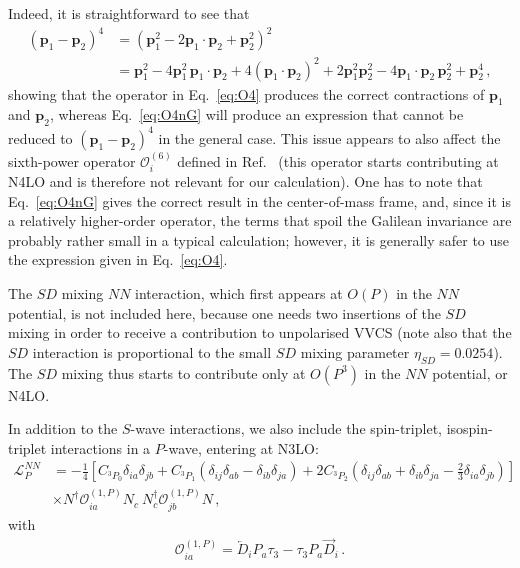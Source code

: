 \documentclass[prl,
twocolumn,
showpacs,preprintnumbers,amsmath,amssymb,
superscriptaddress,
a4paper,nofootinbib,longbibliography]{revtex4-2}
\def\bv#1{\boldsymbol{#1}}
\begin{document}
Indeed, it is straightforward to see that
\begin{align}
    (\bv{p}_1-\bv{p}_2)^4 &= (\bv{p}_1^2-2\bv{p}_1\cdot\bv{p}_2+\bv{p}_2^2)^2 \nonumber\\
    & = \bv{p}_1^2-4\bv{p}_1^2\, \bv{p}_1\cdot\bv{p}_2 +4(\bv{p}_1\cdot \bv{p}_2)^2 + 2\bv{p}_1^2\bv{p}_2^2 - 4 \bv{p}_1\cdot\bv{p}_2\, \bv{p}_2^2+\bv{p}_2^4\,,
\end{align}
showing that the operator in Eq.~\eqref{eq:O4} produces the correct contractions of $\bv{p}_1$ and $\bv{p}_2$, whereas Eq.~\eqref{eq:O4nG} will produce an expression that cannot be reduced to $(\bv{p}_1-\bv{p}_2)^4$ in the general case. This issue appears to also affect the sixth-power operator $\mathcal{O}^{(6)}_i$ defined in Ref.~\cite{Rupak:1999rk} (this operator starts contributing at N4LO and is therefore not relevant for our calculation). One has to note that Eq.~\eqref{eq:O4nG} gives the correct result in the center-of-mass frame, and, since it is a relatively higher-order operator, the terms that spoil the Galilean invariance are probably rather small in a typical calculation; however, it is generally safer to use the expression given in Eq.~\eqref{eq:O4}.

The $SD$ mixing $NN$ interaction, which first appears at $O(P)$ in the $NN$ potential, is not included here, because one needs two insertions of the $SD$ mixing in order to receive a contribution to unpolarised VVCS (note also that the $SD$ interaction is proportional to the small $SD$ mixing parameter $\eta_{SD}=0.0254$). The $SD$ mixing thus starts to contribute only at $O(P^3)$ in the $NN$ potential, or N4LO.

In addition to the $S$-wave interactions, we also include the spin-triplet, isospin-triplet interactions in a $P$-wave, entering at N3LO:
\begin{align}
 \mathcal{L}^{NN}_P&=-\frac{1}{4}\left[
   C_{{}^{3\!}P_0}\delta_{ia}\delta_{jb}
 + C_{{}^{3\!}P_1}\left(\delta_{ij}\delta_{ab}-\delta_{ib}\delta_{ja}\right)
 +2C_{{}^{3\!}P_2}\left(\delta_{ij}\delta_{ab}+\delta_{ib}\delta_{ja}-\frac{2}{3}\delta_{ia}\delta_{jb}\right)
 \right] \nonumber\\
 &\times N^\dagger \mathcal{O}^{(1,P)}_{ia} N_c\ N_c^\dagger \mathcal{O}^{(1,P)}_{jb} N\,,
\end{align}
with 
\begin{align}
    \mathcal{O}^{(1,P)}_{ia} = \overleftarrow{D}_i P_a \tau_3 - \tau_3 P_a \overrightarrow{D}_i\,.
\end{align}
\end{document}
